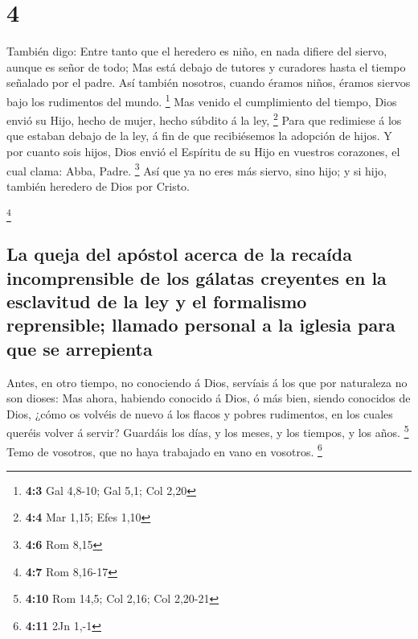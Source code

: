 \hypertarget{section-3}{%
\section{4}\label{section-3}}

 También digo: Entre tanto que el heredero es niño, en nada
difiere del siervo, aunque es señor de todo;  Mas está
debajo de tutores y curadores hasta el tiempo señalado por el padre.
 Así también nosotros, cuando éramos niños, éramos siervos
bajo los rudimentos del mundo. \footnote{\textbf{4:3} Gal 4,8-10; Gal
  5,1; Col 2,20}  Mas venido el cumplimiento del tiempo,
Dios envió su Hijo, hecho de mujer, hecho súbdito á la ley, \footnote{\textbf{4:4}
  Mar 1,15; Efes 1,10}  Para que redimiese á los que estaban
debajo de la ley, á fin de que recibiésemos la adopción de hijos.
 Y por cuanto sois hijos, Dios envió el Espíritu de su Hijo
en vuestros corazones, el cual clama: Abba, Padre. \footnote{\textbf{4:6}
  Rom 8,15}  Así que ya no eres más siervo, sino hijo; y si
hijo, también heredero de Dios por Cristo.

\footnote{\textbf{4:7} Rom 8,16-17}

\hypertarget{la-queja-del-apuxf3stol-acerca-de-la-recauxedda-incomprensible-de-los-guxe1latas-creyentes-en-la-esclavitud-de-la-ley-y-el-formalismo-reprensible-llamado-personal-a-la-iglesia-para-que-se-arrepienta}{%
\subsection{La queja del apóstol acerca de la recaída incomprensible de
los gálatas creyentes en la esclavitud de la ley y el formalismo
reprensible; llamado personal a la iglesia para que se
arrepienta}\label{la-queja-del-apuxf3stol-acerca-de-la-recauxedda-incomprensible-de-los-guxe1latas-creyentes-en-la-esclavitud-de-la-ley-y-el-formalismo-reprensible-llamado-personal-a-la-iglesia-para-que-se-arrepienta}}

 Antes, en otro tiempo, no conociendo á Dios, servíais á los
que por naturaleza no son dioses:  Mas ahora, habiendo
conocido á Dios, ó más bien, siendo conocidos de Dios, ¿cómo os volvéis
de nuevo á los flacos y pobres rudimentos, en los cuales queréis volver
á servir?  Guardáis los días, y los meses, y los tiempos, y
los años. \footnote{\textbf{4:10} Rom 14,5; Col 2,16; Col 2,20-21}
 Temo de vosotros, que no haya trabajado en vano en
vosotros. \footnote{\textbf{4:11} 2Jn 1,-1}


